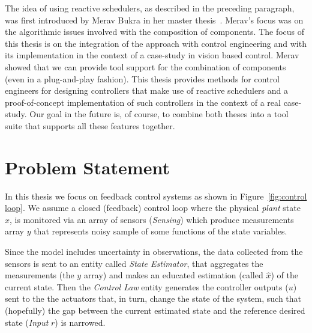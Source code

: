 \documentclass[ twoside, 12pt ]{article}
\begin{document}
The idea of using reactive schedulers, as described in the preceding paragraph, was first introduced by Merav Bukra in her master thesis~\cite{Merav}. Merav's focus was on the algorithmic issues involved with the composition of components. The focus of this thesis is on the integration of the approach with control engineering and with its implementation in the context of a case-study in vision based control. Merav showed that we can provide tool support for the combination of components (even in a plug-and-play fashion). This thesis provides methods for control engineers for designing controllers that make use of reactive schedulers and a proof-of-concept implementation of such controllers in the context of a real case-study. Our goal in the future is, of course, to combine both theses into a tool suite that supports all these features together.

 
\section{Problem Statement}
\label{sec:Problem}
In this thesis we focus on feedback control systems as shown in Figure~\ref{fig:control loop}. We assume a closed (feedback) control loop where the physical \textit{plant} state $x$, is monitored via an array of sensors (\textit{Sensing}) which produce measurements array $y$ that represents noisy sample of some functions of the state variables.

Since the model includes uncertainty in observations, the data collected from the sensors is sent to an entity called \textit{State Estimator}, that aggregates the measurements (the $y$ array) and makes an educated estimation (called $\hat{x}$) of the current state. Then the \textit{Control Law} entity generates the controller outputs ($u$) sent to the the actuators that, in turn, change the state of the system, such that (hopefully) the gap between the current estimated state and the reference desired state (\textit{Input} $r$) is narrowed.
\end{document}
